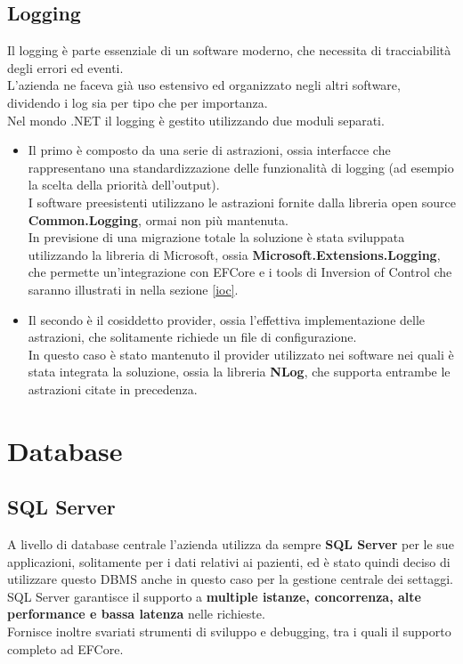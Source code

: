 \documentclass[\main/Tesi.tex]{subfiles}
\begin{document}
\subsection{Logging}
Il logging è parte essenziale di un software moderno, che necessita di tracciabilità degli errori ed eventi.\\ 
L'azienda ne faceva già uso estensivo ed organizzato negli altri software, dividendo i log sia per tipo che per importanza.\\
Nel mondo .NET il logging è gestito utilizzando due moduli separati.\\
\begin{itemize}
    \item Il primo è composto da una serie di astrazioni, ossia interfacce che rappresentano una standardizzazione delle funzionalità di logging (ad esempio la scelta della priorità dell'output).\\I software preesistenti utilizzano le astrazioni fornite dalla libreria open source \textbf{Common.Logging}, ormai non più mantenuta.\\In previsione di una migrazione totale la soluzione è stata sviluppata utilizzando la libreria di Microsoft, ossia \textbf{Microsoft.Extensions.Logging}, che permette un'integrazione con EFCore e i tools di Inversion of Control che saranno illustrati in nella sezione \ref{ioc}.
    \item Il secondo è il cosiddetto provider, ossia l'effettiva implementazione delle astrazioni, che solitamente richiede un file di configurazione.\\In questo caso è stato mantenuto il provider utilizzato nei software nei quali è stata integrata la soluzione, ossia la libreria \textbf{NLog}, che supporta entrambe le astrazioni citate in precedenza.
\end{itemize}

\section{Database}

\subsection{SQL Server}
A livello di database centrale l'azienda utilizza da sempre \textbf{SQL Server} \cite{mssql} per le sue applicazioni, solitamente per i dati relativi ai pazienti, ed è stato quindi deciso di utilizzare questo DBMS anche in questo caso per la gestione centrale dei settaggi.\\
SQL Server garantisce il supporto a \textbf{multiple istanze, concorrenza, alte performance e bassa latenza} nelle richieste.\\
Fornisce inoltre svariati strumenti di sviluppo e debugging, tra i quali il supporto completo ad EFCore.\\
\end{document}
